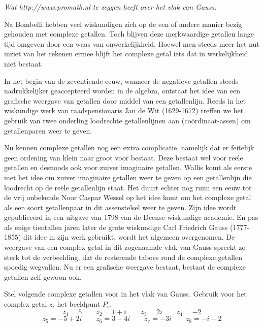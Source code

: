 \documentclass[12pt,twoside]{article}
\begin{document}
\vspace*{1cm}
\begin{mdframed}%
{\em Wat http://www.promath.nl te zeggen heeft over het vlak van Gauss:}

Na Bombelli hebben veel wiskundigen zich op de een of andere manier bezig gehouden met complexe getallen. Toch blijven deze merkwaardige getallen lange tijd omgeven door een waas van onwerkelijkheid. Hoewel men steeds meer het nut inziet van het rekenen ermee blijft het complexe getal iets dat in werkelijkheid niet bestaat.

In het begin van de zeventiende eeuw, wanneer de negatieve getallen steeds nadrukkelijker geaccepteerd worden in de algebra, ontstaat het idee van een grafische weergave van getallen door middel van een getallenlijn. Reeds in het wiskundige werk van raadspensionaris Jan de Wit (1629-1672) treffen we het gebruik van twee onderling loodrechte getallenlijnen aan (coördinaat-assen) om getallenparen weer te geven.

Nu kennen complexe getallen nog een extra complicatie, namelijk dat er feitelijk geen ordening van klein naar groot voor bestaat. Deze bestaat wel voor reële getallen en desnoods ook voor zuiver imaginaire getallen. Wallis komt als eerste met het idee om zuiver imaginaire getallen weer te geven op een getallenlijn die loodrecht op de reële getallenlijn staat. Het duurt echter nog ruim een eeuw tot de vrij onbekende Noor Caspar Wessel op het idee komt om het complexe getal als een soort getallenpaar in dit assenstelsel weer te geven. Zijn idee wordt gepubliceerd in een uitgave van 1798 van de Deense wiskundige academie. En pas als enige tientallen jaren later de grote wiskundige Carl Friedrich Gauss (1777-1855) dit idee in zijn werk gebruikt, wordt het algemeen overgenomen. De weergave van een complex getal in dit zogenaamde vlak van Gauss spreekt zo sterk tot de verbeelding, dat de resterende taboes rond de complexe getallen spoedig wegvallen. Nu er een grafische weergave bestaat, bestaat de complexe getallen zelf gewoon ook. 
\end{mdframed}


\begin{oefening}
Stel volgende complexe getallen voor in het vlak van Gauss. Gebruik voor het complex getal $z_i$ het beeldpunt $P_i$.
$$z_1=5 \qquad z_2=1+i \qquad  z_3=2i \qquad  z_4=-2$$
$$z_5=-5+2i \qquad  z_6=3-4i \qquad  z_7=-3i \qquad  z_8=-i-2$$
\end{oefening}
\end{document}
